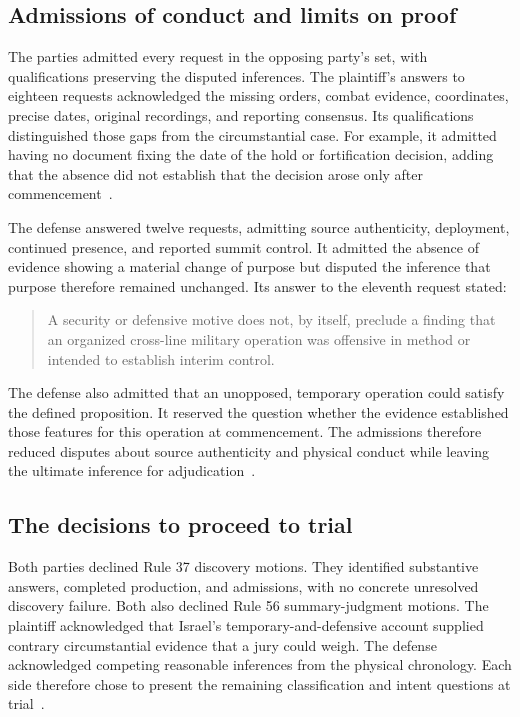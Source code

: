 \documentclass[11pt]{article}
\begin{document}
\subsection{Admissions of conduct and limits on proof}

The parties admitted every request in the opposing party's set, with qualifications preserving the disputed inferences.  The plaintiff's answers to eighteen requests acknowledged the missing orders, combat evidence, coordinates, precise dates, original recordings, and reporting consensus.  Its qualifications distinguished those gaps from the circumstantial case.  For example, it admitted having no document fixing the date of the hold or fortification decision, adding that the absence did not establish that the decision arose only after commencement~\cite[events 79 and 82]{record}.

The defense answered twelve requests, admitting source authenticity, deployment, continued presence, and reported summit control.  It admitted the absence of evidence showing a material change of purpose but disputed the inference that purpose therefore remained unchanged.  Its answer to the eleventh request stated:
\begin{quote}
A security or defensive motive does not, by itself, preclude a finding that an organized cross-line military operation was offensive in method or intended to establish interim control.
\end{quote}
The defense also admitted that an unopposed, temporary operation could satisfy the defined proposition.  It reserved the question whether the evidence established those features for this operation at commencement.  The admissions therefore reduced disputes about source authenticity and physical conduct while leaving the ultimate inference for adjudication~\cite[events 76 and 86]{record}.

\subsection{The decisions to proceed to trial}

Both parties declined Rule 37 discovery motions.  They identified substantive answers, completed production, and admissions, with no concrete unresolved discovery failure.  Both also declined Rule 56 summary-judgment motions.  The plaintiff acknowledged that Israel's temporary-and-defensive account supplied contrary circumstantial evidence that a jury could weigh.  The defense acknowledged competing reasonable inferences from the physical chronology.  Each side therefore chose to present the remaining classification and intent questions at trial~\cite[events 87--90]{record}.
\end{document}
